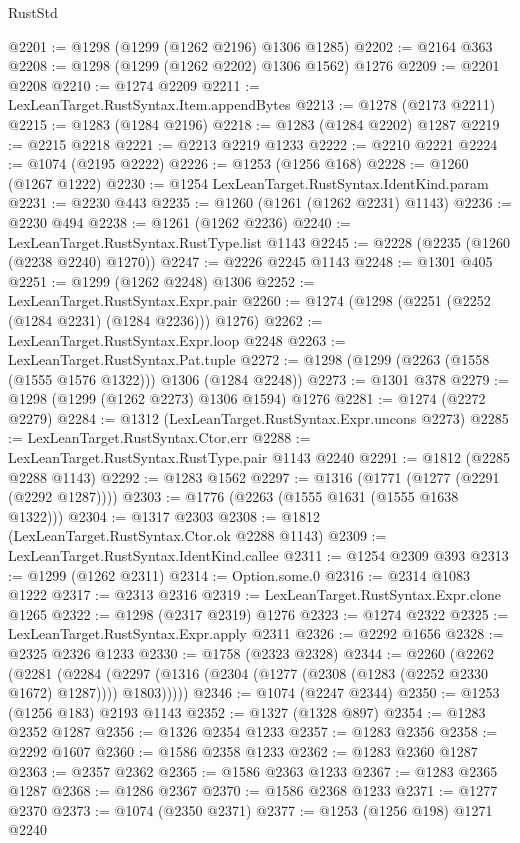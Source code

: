 \begin{lexlean}{RustStd}
\begin{coremodule}
@2201 := @1298 (@1299 (@1262 @2196) @1306 @1285)
@2202 := @2164 @363
@2208 := @1298 (@1299 (@1262 @2202) @1306 @1562) @1276
@2209 := @2201 @2208
@2210 := @1274 @2209
@2211 := LexLeanTarget.RustSyntax.Item.appendBytes
@2213 := @1278 (@2173 @2211)
@2215 := @1283 (@1284 @2196)
@2218 := @1283 (@1284 @2202) @1287
@2219 := @2215 @2218
@2221 := @2213 @2219 @1233
@2222 := @2210 @2221
@2224 := @1074 (@2195 @2222)
@2226 := @1253 (@1256 @168)
@2228 := @1260 (@1267 @1222)
@2230 := @1254 LexLeanTarget.RustSyntax.IdentKind.param
@2231 := @2230 @443
@2235 := @1260 (@1261 (@1262 @2231) @1143)
@2236 := @2230 @494
@2238 := @1261 (@1262 @2236)
@2240 := LexLeanTarget.RustSyntax.RustType.list @1143
@2245 := @2228 (@2235 (@1260 (@2238 @2240) @1270))
@2247 := @2226 @2245 @1143
@2248 := @1301 @405
@2251 := @1299 (@1262 @2248) @1306
@2252 := LexLeanTarget.RustSyntax.Expr.pair
@2260 := @1274 (@1298 (@2251 (@2252 (@1284 @2231) (@1284 @2236))) @1276)
@2262 := LexLeanTarget.RustSyntax.Expr.loop @2248
@2263 := LexLeanTarget.RustSyntax.Pat.tuple
@2272 := @1298 (@1299 (@2263 (@1558 (@1555 @1576 @1322))) @1306 (@1284 @2248))
@2273 := @1301 @378
@2279 := @1298 (@1299 (@1262 @2273) @1306 @1594) @1276
@2281 := @1274 (@2272 @2279)
@2284 := @1312 (LexLeanTarget.RustSyntax.Expr.uncons @2273)
@2285 := LexLeanTarget.RustSyntax.Ctor.err
@2288 := LexLeanTarget.RustSyntax.RustType.pair @1143 @2240
@2291 := @1812 (@2285 @2288 @1143)
@2292 := @1283 @1562
@2297 := @1316 (@1771 (@1277 (@2291 (@2292 @1287))))
@2303 := @1776 (@2263 (@1555 @1631 (@1555 @1638 @1322)))
@2304 := @1317 @2303
@2308 := @1812 (LexLeanTarget.RustSyntax.Ctor.ok @2288 @1143)
@2309 := LexLeanTarget.RustSyntax.IdentKind.callee
@2311 := @1254 @2309 @393
@2313 := @1299 (@1262 @2311)
@2314 := Option.some.{0}
@2316 := @2314 @1083 @1222
@2317 := @2313 @2316
@2319 := LexLeanTarget.RustSyntax.Expr.clone @1265
@2322 := @1298 (@2317 @2319) @1276
@2323 := @1274 @2322
@2325 := LexLeanTarget.RustSyntax.Expr.apply @2311
@2326 := @2292 @1656
@2328 := @2325 @2326 @1233
@2330 := @1758 (@2323 @2328)
@2344 := @2260
    (@2262
      (@2281
        (@2284 (@2297 (@1316 (@2304 (@1277 (@2308 (@1283 (@2252 @2330 @1672) @1287)))) @1803)))))
@2346 := @1074 (@2247 @2344)
@2350 := @1253 (@1256 @183) @2193 @1143
@2352 := @1327 (@1328 @897)
@2354 := @1283 @2352 @1287
@2356 := @1326 @2354 @1233
@2357 := @1283 @2356
@2358 := @2292 @1607
@2360 := @1586 @2358 @1233
@2362 := @1283 @2360 @1287
@2363 := @2357 @2362
@2365 := @1586 @2363 @1233
@2367 := @1283 @2365 @1287
@2368 := @1286 @2367
@2370 := @1586 @2368 @1233
@2371 := @1277 @2370
@2373 := @1074 (@2350 @2371)
@2377 := @1253 (@1256 @198) @1271 @2240

\end{coremodule}
\end{lexlean}
